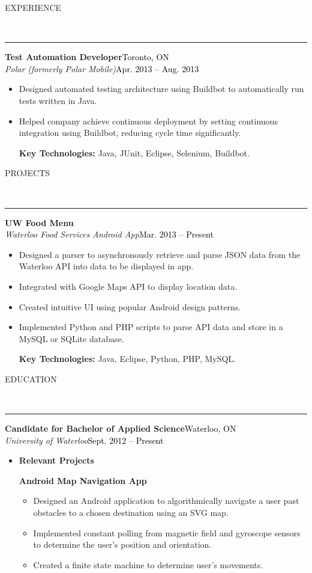 \documentclass[11pt, letterpaper, oneside]{article}
\newcommand{\HRule}[2]{\textcolor{#1}{\rule{\linewidth}{#2}}}
\newcommand{\sectiontitle}[1]{\begin{minipage}{\textwidth}\vspace{-7.5pt}\begin{flushleft}\hspace{-20.5pt}\vspace{-25pt}
\Large\MakeUppercase{#1}\end{flushleft}\end{minipage}\\\HRule{black}{0.15mm}\vspace{\baselineskip}}
\newenvironment{ressection}[1]{
  \sectiontitle{#1}}
  {\vspace{-\baselineskip}}
\newcommand{\resentryheader}[4]{
    \vspace{-5pt}
    \textbf{#1}\hspace{\stretch{1}}\textcolor{black}{#3}\\
    \textit{#2}\hspace{\stretch{1}}\textcolor{black}{#4}\\
}
\newcommand{\resitem}[1]{
    \vspace{2pt}
    \item \begin{flushleft} #1 \end{flushleft}
}
\newcommand{\resinneritem}[1]{
	\vspace{-5pt}
    \item \begin{flushleft} #1 \end{flushleft}
}
\newenvironment{resentry}[4]{
  \begin{minipage}{\textwidth}
    \resentryheader{#1}{#2}{#3}{#4}
        \vspace{-\baselineskip}
    \begin{itemize}[noitemsep,nolistsep]
}{
    \end{itemize}
        \vspace{\baselineskip}
        \end{minipage}
}
\begin{document}
\begin{ressection}{Experience}
  \begin{resentry}{Test Automation Developer}{Polar (formerly Polar Mobile)}{Toronto, ON}{Apr. 2013 -- Aug. 2013}
    \resitem{Designed automated testing architecture using Buildbot to automatically run tests written in Java.}
    \resitem{Helped company achieve continuous deployment by setting continuous integration using Buildbot, reducing cycle time significantly.}
    \vspace{4pt} \hspace{-15pt}
    \textbf{Key Technologies:} Java, JUnit, Eclipse, Selenium, Buildbot.
  \end{resentry}
  
\end{ressection}

\begin{ressection}{Projects}
  \begin{resentry}{UW Food Menu}{Waterloo Food Services Android App}{}{Mar. 2013 -- Present}
    \resitem{Designed a parser to asynchronously retrieve and parse JSON data from the Waterloo API into data to be displayed in app.}
    \resitem{Integrated with Google Maps API to display location data.}
    \resitem{Created intuitive UI using popular Android design patterns.}
    \resitem{Implemented Python and PHP scripts to parse API data and store in a MySQL or SQLite database.}
    \vspace{4pt} \hspace{-15pt}
    \textbf{Key Technologies:} Java, Eclipse, Python, PHP, MySQL.
  \end{resentry}
\end{ressection}

\begin{ressection}{Education}
  \begin{resentry}{Candidate for Bachelor of Applied Science}{University of Waterloo}{Waterloo, ON}{Sept. 2012 -- Present}
    \resitem{\textbf{Relevant Projects}}
	\textbf{Android Map Navigation App}   
    \begin{itemize}
		\resinneritem{Designed an Android application to algorithmically navigate a user past obstacles to a chosen destination using an SVG map.}
		\resinneritem{Implemented constant polling from magnetic field and gyroscope sensors to determine the user's position and orientation.}
		\resinneritem{Created a finite state machine to determine user's movements.}
		
	\end{itemize}
  \end{resentry}
\end{ressection}
\end{document}
